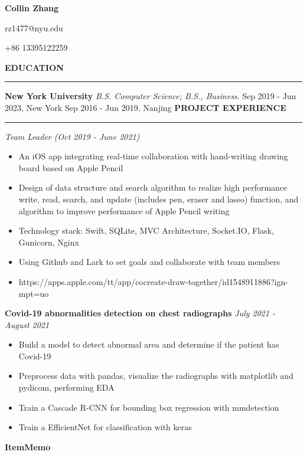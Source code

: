 \documentclass{article}
\begin{document}
\begin{center}
{\huge \textbf{Collin Zhang}}\par
rz1477@nyu.edu\par+86 13395122259
\end{center}

\noindent
{\textbf{EDUCATION}}\newline
\rule{\textwidth}{1pt}\newline
{\textbf {New York University}}\newline
\emph {B.S. Computer Science; B.S., Business}.\newline
{Sep 2019 - Jun 2023, New York}\newline
{}\newline
{Sep 2016 - Jun 2019, Nanjing}\newline
\newline
\noindent
{\textbf{PROJECT EXPERIENCE}}\newline
\rule{\textwidth}{1pt}\newline
\emph{Team Leader (Oct 2019 - June 2021)}
\begin{itemize}[leftmargin=*]
\item An iOS app integrating real-time collaboration with hand-writing drawing board based on Apple Pencil
\item Design of data structure and search algorithm to realize high performance write, read, search, and update (includes pen, eraser and lasso) function, and algorithm to improve performance of Apple Pencil writing
\item Technology stack: Swift, SQLite, MVC Architecture, Socket.IO, Flask, Gunicorn, Nginx
\item Using Github and Lark to set goals and collaborate with team members
\item https://apps.apple.com/tt/app/cocreate-draw-together/id1548911886?ign-mpt=uo%

\end{itemize}{\textbf{Covid-19 abnormalities detection on chest radiographs}}\newline
\emph{July 2021 - August 2021}
\begin{itemize}[leftmargin=*]
\item Build a model to detect abnormal area and determine if the patient has Covid-19
\item Preprocess data with pandas, visualize the radiographs with matplotlib and pydicom, performing EDA
\item Train a Cascade R-CNN for bounding box regression with mmdetection
\item Train a EfficientNet for classification with keras

\end{itemize}{\textbf{ItemMemo}}\newline
\end{document}
